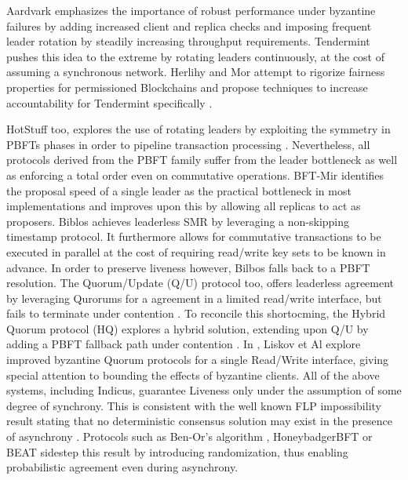Aardvark \cite{clement2009making} emphasizes the importance of robust performance under byzantine failures by adding increased client and replica checks and imposing frequent leader rotation by steadily increasing throughput requirements. Tendermint \cite{buchman2016tendermint} pushes this idea to the extreme by rotating leaders continuously, at the cost of assuming a synchronous network. Herlihy and Mor attempt to rigorize fairness properties for permissioned Blockchains and propose techniques to increase accountability for Tendermint specifically \cite{herlihy2016enhancing}.

HotStuff too, explores the use of rotating leaders by exploiting the symmetry in PBFTs phases in order to pipeline transaction processing \cite{yin2019hotstuff}. 
Nevertheless, all protocols derived from the PBFT family suffer from the leader bottleneck as well as enforcing a total order even on commutative operations. BFT-Mir \cite{stathakopoulou2019mir} identifies the proposal speed of a single leader as the practical bottleneck in most implementations and improves upon this by allowing all replicas to act as proposers.
Biblos \cite{bazzi2018clairvoyant} achieves leaderless SMR by leveraging a non-skipping timestamp protocol. It furthermore allows for commutative transactions to be executed in parallel at the cost of requiring read/write key sets to be known in advance. In order to preserve liveness however, Bilbos falls back to a PBFT resolution. 
The Quorum/Update (Q/U) protocol too, offers leaderless agreement by leveraging Qurorums for a agreement in a limited read/write interface, but fails to terminate under contention \cite{abd2005fault}. To reconcile this shortocming, the Hybrid Quorum protocol (HQ) explores a hybrid solution, extending upon Q/U by adding a PBFT fallback path under contention \cite{cowling2006hq}. In \cite{liskov2006tolerating}, Liskov et Al explore improved byzantine Quorum protocols for a single Read/Write interface, giving special attention to bounding the effects of byzantine clients. 
All of the above systems, including Indicus, guarantee Liveness only under the assumption of some degree of synchrony. This is consistent with the well known FLP impossibility result stating that no deterministic consensus solution may exist in the presence of asynchrony \cite{fischer1985impossibility}. Protocols such as Ben-Or's algorithm \cite{ben1983another}, HoneybadgerBFT \cite{miller2016honey} or BEAT \cite{duan2018beat} sidestep this result by introducing randomization, thus enabling probabilistic agreement even during asynchrony.

